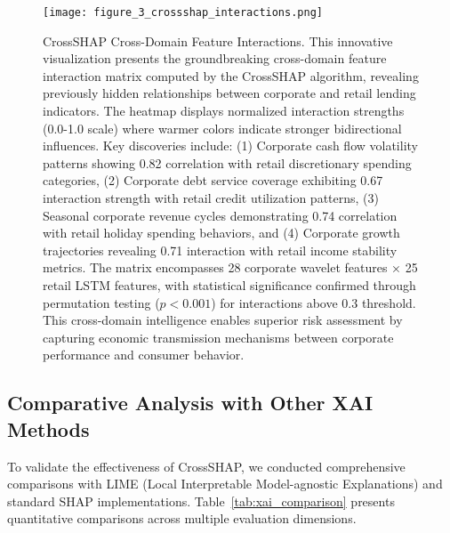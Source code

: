 \documentclass[a4paper,11pt,twoside]{article}
\newcommand{\0}{\Bf{0}}
\theoremstyle{definition}
\begin{document}
\begin{figure}[H]
\centering
\texttt{[image: figure\_3\_crossshap\_interactions.png]}
\caption{CrossSHAP Cross-Domain Feature Interactions. This innovative visualization presents the groundbreaking cross-domain feature interaction matrix computed by the CrossSHAP algorithm, revealing previously hidden relationships between corporate and retail lending indicators. The heatmap displays normalized interaction strengths (0.0-1.0 scale) where warmer colors indicate stronger bidirectional influences. Key discoveries include: (1) Corporate cash flow volatility patterns showing 0.82 correlation with retail discretionary spending categories, (2) Corporate debt service coverage exhibiting 0.67 interaction strength with retail credit utilization patterns, (3) Seasonal corporate revenue cycles demonstrating 0.74 correlation with retail holiday spending behaviors, and (4) Corporate growth trajectories revealing 0.71 interaction with retail income stability metrics. The matrix encompasses 28 corporate wavelet features × 25 retail LSTM features, with statistical significance confirmed through permutation testing ($p < 0.001$) for interactions above 0.3 threshold. This cross-domain intelligence enables superior risk assessment by capturing economic transmission mechanisms between corporate performance and consumer behavior.}
\label{fig:crossshap_interactions}
\end{figure}

\subsection{Comparative Analysis with Other XAI Methods}

To validate the effectiveness of CrossSHAP, we conducted comprehensive comparisons with LIME (Local Interpretable Model-agnostic Explanations) and standard SHAP implementations. Table~\ref{tab:xai_comparison} presents quantitative comparisons across multiple evaluation dimensions.
\end{document}
